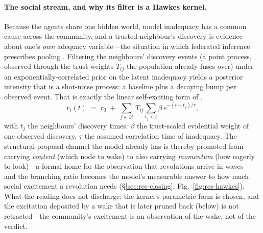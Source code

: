 \paragraph{The social stream, and why its filter is a Hawkes kernel.}
Because the agents share one hidden world, model inadequacy has a common cause across the
community, and a trusted neighbour's discovery is evidence about one's \emph{own} adequacy
variable---the situation in which federated inference prescribes pooling
\citep{friston2023federated}. Filtering the neighbours' discovery events (a point process,
observed through the trust weights $T_{ij}$ the population already fuses over) under an
exponentially-correlated prior on the latent inadequacy yields a posterior intensity that is a
shot-noise process: a baseline plus a decaying bump per observed event. That is exactly the
linear self-exciting form of \citet{hawkes1971},
\begin{equation}
r_i(t) \;=\; r_0 \;+\; \sum_{j\in\partial i}\, T_{ij} \sum_{t_j < t} \beta\, e^{-(t-t_j)/\tau},
\end{equation}
with $t_j$ the neighbours' discovery times: $\beta$ the trust-scaled evidential weight of one
observed discovery, $\tau$ the assumed correlation time of inadequacy. The structural-proposal
channel the model already has is thereby promoted from carrying \emph{content} (which node to
wake) to also carrying \emph{momentum} (how eagerly to look)---a formal home for the observation
that revolutions arrive in waves---and the branching ratio becomes the model's measurable answer
to how much social excitement a revolution needs (\S\ref{sec:res-closing},
Fig.~\ref{fig:res-hawkes}). What the reading does not discharge: the kernel's parametric form is
chosen, and the excitation deposited by a wake that is later pruned back (below) is not
retracted---the community's excitement is an observation of the wake, not of the verdict.

